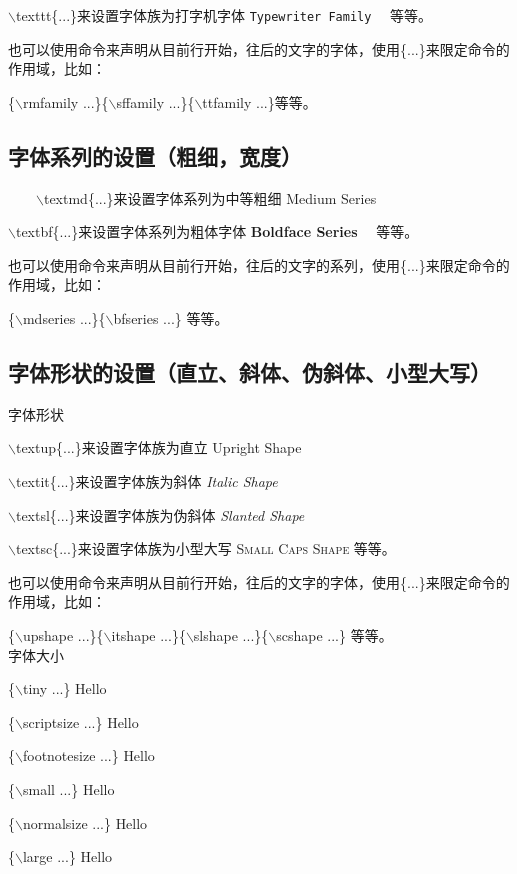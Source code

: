 \documentclass{article}
\begin{document}
\begin{CJK}{UTF8}{gbsn}
$\backslash$texttt\{...\}来设置字体族为打字机字体 \texttt{Typewriter Family}   \ \ 等等。

也可以使用命令来声明从目前行开始，往后的文字的字体，使用\{...\}来限定命令的作用域，比如：

\{$\backslash$rmfamily ...\}\{$\backslash$sffamily ...\}\{$\backslash$ttfamily ...\}等等。

\subsection{字体系列的设置（粗细，宽度）}
\ \ \ \ $\backslash$textmd\{...\}来设置字体系列为中等粗细 \textmd{Medium Series}

$\backslash$textbf\{...\}来设置字体系列为粗体字体 \textbf{Boldface Series }
  \ \ 等等。

也可以使用命令来声明从目前行开始，往后的文字的系列，使用\{...\}来限定命令的作用域，比如：

\{$\backslash$mdseries ...\}\{$\backslash$bfseries ...\} 等等。

\subsection{字体形状的设置（直立、斜体、伪斜体、小型大写）}
字体形状

$\backslash$textup\{...\}来设置字体族为直立 \textup{Upright Shape}

$\backslash$textit\{...\}来设置字体族为斜体 \textit{Italic Shape}

$\backslash$textsl\{...\}来设置字体族为伪斜体 \textit{Slanted Shape}

$\backslash$textsc\{...\}来设置字体族为小型大写 \textsc{Small Caps Shape}
等等。

也可以使用命令来声明从目前行开始，往后的文字的字体，使用\{...\}来限定命令的作用域，比如：

\{$\backslash$upshape ...\}\{$\backslash$itshape ...\}\{$\backslash$slshape ...\}\{$\backslash$scshape ...\} 等等。
\\
字体大小

\{$\backslash$tiny ...\}  {\tiny Hello}

\{$\backslash$scriptsize ...\}  {\scriptsize Hello}

\{$\backslash$footnotesize ...\}  {\footnotesize Hello}

\{$\backslash$small ...\}  {\small Hello}

\{$\backslash$normalsize ...\}  {\normalsize Hello}

\{$\backslash$large ...\}  {\large Hello}


\end{CJK}
\end{document}
